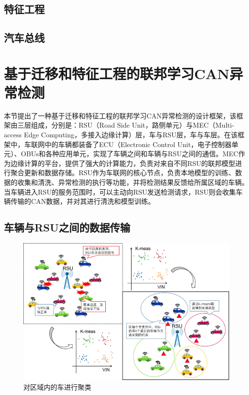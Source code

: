 \subsection{特征工程}

\subsection{汽车总线}

\section{基于迁移和特征工程的联邦学习CAN异常检测}\label{sec:HC}

本节提出了一种基于迁移和特征工程的联邦学习CAN异常检测的设计框架，该框架由三层组成，分别是：RSU（Road Side Unit，路侧单元）与MEC（Multi-access Edge Computing，多接入边缘计算）层，车与RSU层，车与车层。在该框架中，车联网中的车辆都装备了ECU（Electronic Control Unit，电子控制器单元）、OBUs和各种应用单元，实现了车辆之间和车辆与RSU之间的通信。MEC作为边缘计算的平台，提供了强大的计算能力，负责对来自不同RSU的联邦模型进行聚合更新和数据存储。RSU作为车联网的核心节点，负责本地模型的训练、数据的收集和清洗、异常检测的执行等功能，并将检测结果反馈给所属区域的车辆。当车辆进入RSU的服务范围时，可以主动向RSU发送检测请求，RSU则会收集车辆传输的CAN数据，并对其进行清洗和模型训练。

\subsection{车辆与RSU之间的数据传输}

\begin{figure}[htb]
\centering
    \includegraphics[scale=0.5]{figures/figure1.jpg}
    \caption{对区域内的车进行聚类}
    \label{fig:Cluster the cars in the region}
\end{figure}

